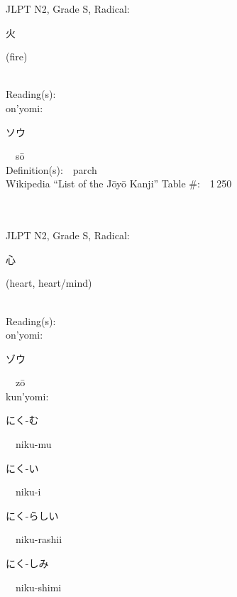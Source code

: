 \begin{multicols}{2}
{JLPT N2, Grade S, Radical:\ \ {\begin{CJK}{UTF8}{min} 火 \end{CJK}} (fire) } \\
Reading(s):\ \ \\
{\hspace*{1em}}on'yomi:\ \ \\
{\hspace*{2em}}{\begin{CJK}{UTF8}{min} ソウ \end{CJK}}\ \ s\=o\ \ \\
Definition(s):\ \ parch \\
Wikipedia ``List of the J\=oy\=o Kanji'' Table \#:\ \ 1\,250 \\
\ \ \\
{\fontsize{34pt}{40pt}  }\ \ \\  %
{JLPT N2, Grade S, Radical:\ \ {\begin{CJK}{UTF8}{min} 心 \end{CJK}} (heart, heart/mind) } \\
Reading(s):\ \ \\
{\hspace*{1em}}on'yomi:\ \ \\
{\hspace*{2em}}{\begin{CJK}{UTF8}{min} ゾウ \end{CJK}}\ \ z\=o\ \ \\
{\hspace*{1em}}kun'yomi:\ \ \\
{\hspace*{2em}}{\begin{CJK}{UTF8}{min} にく-む \end{CJK}}\ \ niku-mu\ \ \\
{\hspace*{2em}}{\begin{CJK}{UTF8}{min} にく-い \end{CJK}}\ \ niku-i\ \ \\
{\hspace*{2em}}{\begin{CJK}{UTF8}{min} にく-らしい \end{CJK}}\ \ niku-rashii\ \ \\
{\hspace*{2em}}{\begin{CJK}{UTF8}{min} にく-しみ \end{CJK}}\ \ niku-shimi\ \ \\

\end{multicols}
